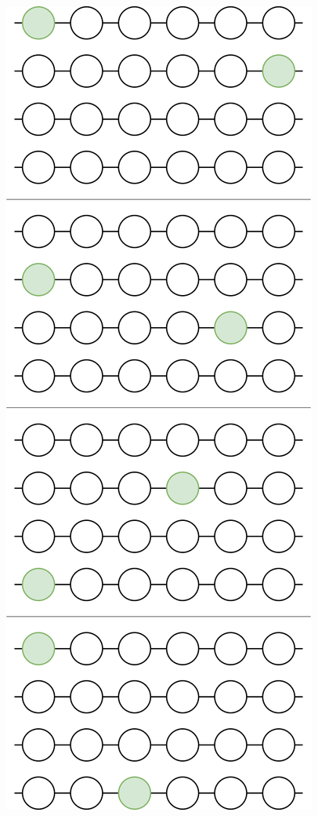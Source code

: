 \begin{minipage}{0.35\textwidth}
    \centering
    \includegraphics[width=\textwidth]{image/ukulele-fretboard-tonics.png}
    \label{fig:ukulele_tonic_intervals}
\end{minipage}


